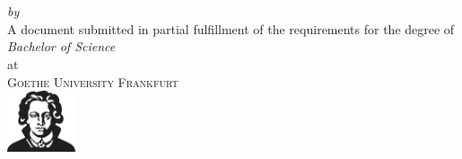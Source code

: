 \begin{titlepage}
  \vspace*{5cm}
  \makeatletter
  \begin{center}
    \begin{Huge}
      \@title
    \end{Huge}\\[0.1cm]
    \begin{Large}
      \@subtitle
    \end{Large}\\
    \emph{by}\\
    \@author
    \vfill
    A document submitted in partial fulfillment
    of the requirements for the degree of\\
    \emph{Bachelor of Science}\\
    at\\
    \textsc{Goethe University Frankfurt}\\[2\baselineskip]
    \includegraphics[width=2cm]{Sources/Goethe_kompakt}
  \end{center}
  \makeatother
\end{titlepage}

\newpage
\null
\thispagestyle{empty}
\newpage

